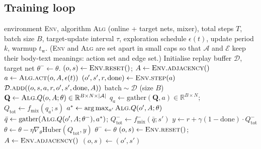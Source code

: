 \begin{appendices}
\section{Training loop}
\label{app:trainloop}

\begin{algorithm}[!ht]
\caption{Shared training loop (CTDE, off-policy, Double-DQN). For \iql,
the team-loss line is replaced by a per-agent Huber sum (see
Section~\ref{sec:algos}).}
\label{alg:train}
\begin{algorithmic}[1]
\Require environment \textsc{Env}, algorithm \textsc{Alg} (online + target
  nets, mixer), total steps $T$, batch size $B$, target-update interval
  $\tau$, exploration schedule $\epsilon(t)$, update period $k$, warmup
  $t_{\text{w}}$. (\textsc{Env} and \textsc{Alg} are set apart in small
  caps so that $\mathcal{A}$ and $\mathcal{E}$ keep their body-text
  meanings: action set and edge set.)
\State Initialise replay buffer $\mathcal{D}$, target net $\theta^- \leftarrow \theta$.
\State $(o, s) \leftarrow \textsc{Env}.\textsc{reset}()$;\; $A \leftarrow \textsc{Env}.\textsc{adjacency}()$
  \State $a \leftarrow \textsc{Alg}.\textsc{act}(o, A, \epsilon(t))$
  \State $(o', s', r, \text{done}) \leftarrow \textsc{Env}.\textsc{step}(a)$
  \State $\mathcal{D}.\textsc{add}((o, s, a, r, o', s', \text{done}, A))$
    \State $\text{batch} \sim \mathcal{D}$ \quad (size $B$)
    \State $\mathbf{Q} \leftarrow \textsc{Alg}.Q(o, A; \theta) \in \mathbb{R}^{B \times N \times |\mathcal{A}|}$
    \State $q_a \leftarrow \mathrm{gather}(\mathbf{Q}, a) \in \mathbb{R}^{B \times N}$;\;
           $Q_{\text{tot}} \leftarrow f_{\text{mix}}(q_a; s)$
    \State $a^* \leftarrow \arg\max_{a'} \textsc{Alg}.Q(o', A; \theta)$
    \State $\bar q \leftarrow \mathrm{gather}(\textsc{Alg}.Q(o', A; \theta^-), a^*)$;\;
           $Q^{-}_{\text{tot}} \leftarrow f_{\text{mix}}^{-}(\bar q; s')$
    \State $y \leftarrow r + \gamma (1{-}\text{done}) \cdot Q^{-}_{\text{tot}}$
    \State $\theta \leftarrow \theta - \eta \nabla_\theta \mathrm{Huber}(Q_{\text{tot}}, y)$
     $\theta^- \leftarrow \theta$ \EndIf
  \EndIf
   $(o, s) \leftarrow \textsc{Env}.\textsc{reset}()$;\; $A \leftarrow \textsc{Env}.\textsc{adjacency}()$
  \Else \;$(o, s) \leftarrow (o', s')$
  \EndIf
\EndFor
\end{algorithmic}
\end{algorithm}


\end{appendices}
